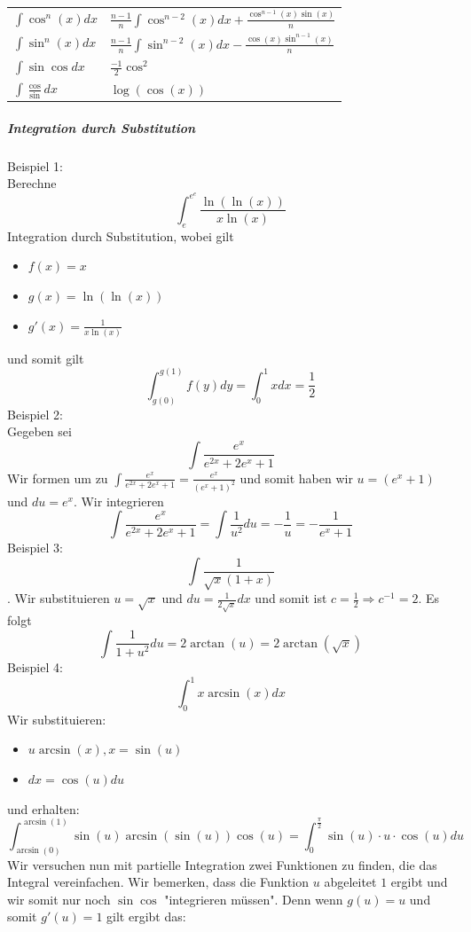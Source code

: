 \documentclass[7pt,landscape, margin = 0.1mm]{article}
\begin{document}
\begin{multicols}{4}
\begin{center}
\begin{tabularx}{\linewidth}{>{\centering\arraybackslash}X>{\centering\arraybackslash}X}
 $\int \cos^n(x) d x$ & $\frac{n-1}{n} \int \cos^{n-2}(x) d x+\frac{\cos^{n-1}(x) \sin (x)}{n}$ \\
$ \int \sin^n(x) d x $ & $\frac{n-1}{n} \int \sin ^{n-2}(x) d x-\frac{\cos (x) \sin ^{n-1}(x)}{n}$\\


$\int \sin \cos dx$ & $\frac{-1}{2}\cos^2$\\
  $\int \frac{\cos}{ \sin} dx$ & $\log(\cos(x))$\\
  
  \bottomrule
 \end{tabularx}
\end{center}


\begin{flushleft}
\vspace{1mm} \hline \vspace{1mm}
\subparagraph{Integration durch Substitution}
Beispiel 1:\\
Berechne $$\int_{e}^{e^e} \frac{\ln(\ln(x))}{x \ln(x)}$$
Integration durch Substitution, wobei gilt
\begin{itemize}
\item $f(x)=x$
\item $g(x) = \ln(\ln(x))$
\item $g'(x) =  \frac{1}{x \ln(x)}$
\end{itemize}
und somit gilt
$$\int_{g(0)}^{g(1)} f(y)dy = \int_{0}^{1} x dx = \frac{1}{2}$$ 
Beispiel 2:\\
Gegeben sei $$\int \frac{e^x}{e^{2x}+2e^x+1}$$
Wir formen um zu
$\int \frac{e^x}{e^{2x}+2e^x+1} = \frac{e^x}{(e^x+1)^2}$ und somit haben wir $u = (e^x+1)$ und $du=e^x$. Wir integrieren
$$\int \frac{e^x}{e^{2x}+2e^x+1}=\int \frac{1}{u^2}du = -\frac{1}{u} = -\frac{1}{e^x+1}$$
Beispiel 3:\\
$$\int \frac{1}{\sqrt{x}(1+x)}$$. Wir substituieren $u = \sqrt{x}$ und $du = \frac{1}{2\sqrt{x}} dx$ und somit ist $c=\frac{1}{2} \Rightarrow c^{-1} = 2$. Es folgt $$\int \frac{1}{1+u^2} du = 2\arctan(u) = 2\arctan(\sqrt{x})$$
Beispiel 4:\\
$$\int_{0}^{1} x \arcsin(x) dx$$
Wir substituieren:
\begin{itemize}
\item $u \arcsin(x), x = \sin(u)$
\item $dx = \cos(u)du$
\end{itemize}
und erhalten:
$$\int_{\arcsin(0)}^{\arcsin(1)} \sin(u) \arcsin(\sin(u)) \cos(u) = \int_{0}^{\frac{\pi}{2}} \sin(u) \cdot u \cdot \cos(u) du$$
Wir versuchen nun mit partielle Integration zwei Funktionen zu finden, die das Integral vereinfachen. Wir bemerken, dass die Funktion $u$ abgeleitet $1$ ergibt und wir somit nur noch $\sin \cos$ "integrieren müssen". Denn wenn $g(u)=u$ und somit $g'(u)=1$ gilt ergibt das:

\end{flushleft}
\end{multicols}
\end{document}
